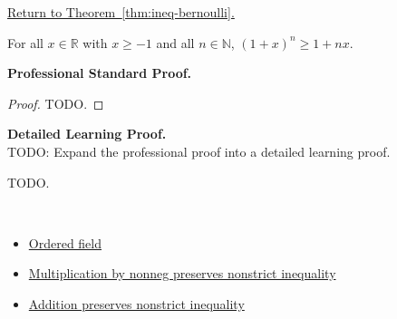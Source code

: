 \newpage
{}
\label{prf:ineq-bernoulli}

\begin{remark*}[Return]
\hyperref[thm:ineq-bernoulli]{Return to Theorem~\ref*{thm:ineq-bernoulli}.}
\end{remark*}

\begin{theorem*}
For all $x \in \mathbb{R}$ with $x \ge -1$ and all $n \in \mathbb{N}$,
$(1 + x)^n \ge 1 + nx$.
\end{theorem*}

\textbf{Professional Standard Proof.}~\\
\begin{proof}
TODO.
\end{proof}

\textbf{Detailed Learning Proof.}~\\
TODO: Expand the professional proof into a detailed learning proof.


\begin{remark*}
TODO.
\end{remark*}

\begin{remark*}[Dependencies]~\\
\begin{itemize}
  \item \hyperref[def:ordered-field]{Ordered field}
  \item \hyperref[thm:ineq-nonstrict-multiply-nonneg]{Multiplication by nonneg preserves nonstrict inequality}
  \item \hyperref[thm:ineq-nonstrict-add-both-sides]{Addition preserves nonstrict inequality}
\end{itemize}
\end{remark*}
